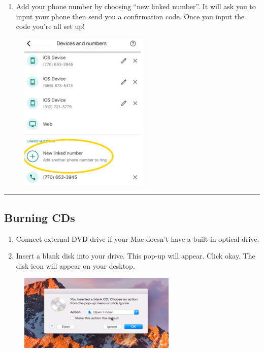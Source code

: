 \documentclass[]{book}
\providecommand{\tightlist}{%
  \setlength{\itemsep}{0pt}\setlength{\parskip}{0pt}}
\begin{document}
\begin{enumerate}
\def\labelenumi{\arabic{enumi})}
\setcounter{enumi}{6}
\tightlist
\item
  Add your phone number by choosing ``new linked number''. It will ask you to input your phone then send you a confirmation code. Once you input the code you're all set up!
\end{enumerate}

\begin{figure}
\centering
\includegraphics{images/research_protocols/google_voice/pic7.png}
\caption{}
\end{figure}

\begin{center}\rule{0.5\linewidth}{0.5pt}\end{center}

\hypertarget{burning-cds}{%
\subsection{Burning CDs}\label{burning-cds}}

\begin{enumerate}
\def\labelenumi{\arabic{enumi}.}
\item
  Connect external DVD drive if your Mac doesn't have a built-in optical drive.
\item
  Insert a blank disk into your drive. This pop-up will appear. Click okay. The disk icon will appear on your desktop.
\end{enumerate}

\begin{figure}
\centering
\includegraphics{images/lab_protocols/cd_burning/1.png}
\caption{}
\end{figure}
\end{document}
